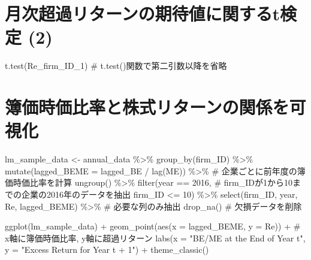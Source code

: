 \documentclass[
  letterpaper,
  DIV=11,
  numbers=noendperiod]{scrreprt}
\newenvironment{Shaded}{\begin{snugshade}}{\end{snugshade}}
\newcommand{\AttributeTok}[1]{\textcolor[rgb]{0.40,0.45,0.13}{#1}}
\newcommand{\CommentTok}[1]{\textcolor[rgb]{0.37,0.37,0.37}{#1}}
\newcommand{\DecValTok}[1]{\textcolor[rgb]{0.68,0.00,0.00}{#1}}
\newcommand{\FunctionTok}[1]{\textcolor[rgb]{0.28,0.35,0.67}{#1}}
\newcommand{\NormalTok}[1]{\textcolor[rgb]{0.00,0.23,0.31}{#1}}
\newcommand{\OtherTok}[1]{\textcolor[rgb]{0.00,0.23,0.31}{#1}}
\newcommand{\SpecialCharTok}[1]{\textcolor[rgb]{0.37,0.37,0.37}{#1}}
\newcommand{\StringTok}[1]{\textcolor[rgb]{0.13,0.47,0.30}{#1}}
\begin{document}
\section{月次超過リターンの期待値に関するt検定
(2)}\label{ux6708ux6b21ux8d85ux904eux30eaux30bfux30fcux30f3ux306eux671fux5f85ux5024ux306bux95a2ux3059ux308btux691cux5b9a-2}

\begin{Shaded}
\begin{Highlighting}[]
\FunctionTok{t.test}\NormalTok{(Re\_firm\_ID\_1) }\CommentTok{\# t.test()関数で第二引数以降を省略}
\end{Highlighting}
\end{Shaded}

\section{簿価時価比率と株式リターンの関係を可視化}\label{ux7c3fux4fa1ux6642ux4fa1ux6bd4ux7387ux3068ux682aux5f0fux30eaux30bfux30fcux30f3ux306eux95a2ux4fc2ux3092ux53efux8996ux5316}

\begin{Shaded}
\begin{Highlighting}[]
\NormalTok{lm\_sample\_data }\OtherTok{\textless{}{-}}\NormalTok{ annual\_data }\SpecialCharTok{\%\textgreater{}\%} 
  \FunctionTok{group\_by}\NormalTok{(firm\_ID) }\SpecialCharTok{\%\textgreater{}\%}
  \FunctionTok{mutate}\NormalTok{(}\AttributeTok{lagged\_BEME =}\NormalTok{ lagged\_BE }\SpecialCharTok{/} \FunctionTok{lag}\NormalTok{(ME)) }\SpecialCharTok{\%\textgreater{}\%} \CommentTok{\# 企業ごとに前年度の簿価時価比率を計算}
  \FunctionTok{ungroup}\NormalTok{() }\SpecialCharTok{\%\textgreater{}\%}
  \FunctionTok{filter}\NormalTok{(year }\SpecialCharTok{==} \DecValTok{2016}\NormalTok{, }\CommentTok{\# firm\_IDが1から10までの企業の2016年のデータを抽出}
\NormalTok{         firm\_ID }\SpecialCharTok{\textless{}=} \DecValTok{10}\NormalTok{) }\SpecialCharTok{\%\textgreater{}\%}
  \FunctionTok{select}\NormalTok{(firm\_ID, year, Re, lagged\_BEME) }\SpecialCharTok{\%\textgreater{}\%} \CommentTok{\# 必要な列のみ抽出}
  \FunctionTok{drop\_na}\NormalTok{() }\CommentTok{\# 欠損データを削除 }

\FunctionTok{ggplot}\NormalTok{(lm\_sample\_data) }\SpecialCharTok{+} 
  \FunctionTok{geom\_point}\NormalTok{(}\FunctionTok{aes}\NormalTok{(}\AttributeTok{x =}\NormalTok{ lagged\_BEME, }\AttributeTok{y =}\NormalTok{ Re)) }\SpecialCharTok{+} \CommentTok{\# x軸に簿価時価比率, y軸に超過リターン}
  \FunctionTok{labs}\NormalTok{(}\AttributeTok{x =} \StringTok{"BE/ME at the End of Year t"}\NormalTok{, }\AttributeTok{y =} \StringTok{"Excess Return for Year t + 1"}\NormalTok{) }\SpecialCharTok{+} 
  \FunctionTok{theme\_classic}\NormalTok{()}
\end{Highlighting}
\end{Shaded}
\end{document}
